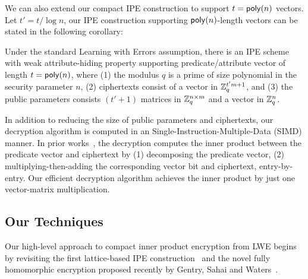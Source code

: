 We can also extend our compact IPE construction to support $t = \mathsf{poly}(n)$ vectors. Let $t' = t / \log n$, our IPE construction supporting $\mathsf{poly}(n)$-length vectors can be stated in the following corollary:
\begin{cor}\label{cor}
Under the standard Learning with Errors assumption, there is an IPE scheme with weak attribute-hiding property supporting predicate/attribute vector of length $t = \mathsf{poly}(n)$, where (1) the modulus $q$ is a prime of size polynomial in the security parameter $n$, (2) ciphertexts consist of a vector in $\mathbb{Z}_q^{t'm + 1}$, and (3) the public parameters consists $(t' + 1)$ matrices in $\mathbb{Z}_q^{n \times m}$ and a vector in $\mathbb{Z}_q^n$.
\end{cor}
In addition to reducing the size of public parameters and ciphertexts, our decryption algorithm is computed in an Single-Instruction-Multiple-Data (SIMD) manner. In prior works~\cite{AC:AgrFreVai11,PKC:Xagawa13}, the decryption computes the inner product between the predicate vector and ciphertext by (1) decomposing the predicate vector, (2) multiplying-then-adding the corresponding vector bit and ciphertext, entry-by-entry. Our efficient decryption algorithm achieves the inner product by just one vector-matrix multiplication.

\subsection{Our Techniques}
Our high-level approach to compact inner product encryption from LWE begins by revisiting the first lattice-based IPE construction~\cite{AC:AgrFreVai11} and the novel fully homomorphic encryption proposed recently by Gentry, Sahai and Waters~\cite{C:GenSahWat13}.

